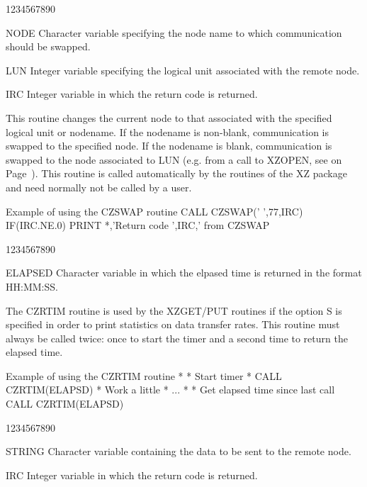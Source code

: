 \begin{DLtt}{1234567890}
\item[NODE]Character variable specifying the node name to which communication
should be swapped.
\item[LUN]Integer variable specifying the logical unit associated with
the remote node.
\item[IRC]Integer variable in which the return code is returned.
\end{DLtt}
\par
This routine changes the current node to that associated with the
specified logical unit or nodename. If the nodename is non-blank,
communication is swapped to the specified node. If the nodename
is blank, communication is swapped to the node associated
to LUN (e.g. from a call to XZOPEN, see on Page~\pageref{XZOPEN}).
This routine is called automatically
by the routines of the XZ package and need normally not be called
by a user.
\begin{XMPt}{Example of using the CZSWAP routine}
      CALL CZSWAP(' ',77,IRC)
      IF(IRC.NE.0) PRINT *,'Return code ',IRC,' from CZSWAP
\end{XMPt}
\begin{DLtt}{1234567890}
\item[ELAPSED]Character variable in which the elpased time is returned in the
format HH:MM:SS.
\end{DLtt}
\par
The CZRTIM routine is used by the XZGET/PUT routines if the option
S is specified in order to print statistics on data transfer rates.
This routine must always be called twice: once
to start the timer and a second time to return the elapsed time.
\begin{XMPt}{Example of using the CZRTIM routine}
*
*     Start timer
*
      CALL CZRTIM(ELAPSD)
*     Work a little
*     ...
*
*     Get elapsed time since last call
      CALL CZRTIM(ELAPSD)
\end{XMPt}
\begin{DLtt}{1234567890}
\item[STRING]Character variable containing the data to be sent to the remote node.
\item[IRC]Integer variable in which the return code is returned.
\end{DLtt}
